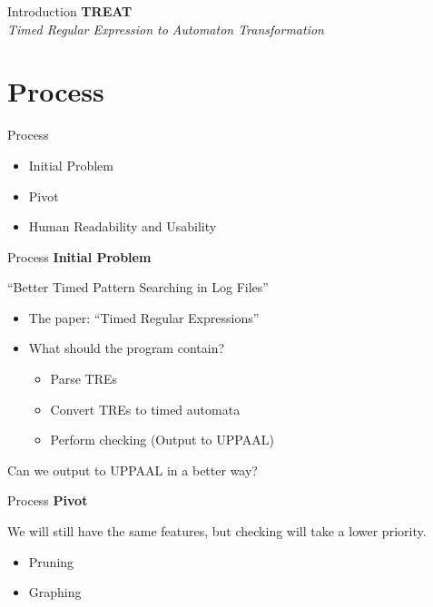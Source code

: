 
\begin{frame}{Introduction}
    \centering
    \LARGE\textbf{TREAT} \\
    \vspace{0.5cm}
    \Large\textit{Timed Regular Expression to Automaton Transformation}
\end{frame}

\section{Process}

\begin{frame}{Process}
    \begin{itemize}
        \item Initial Problem
        \item Pivot
        \item Human Readability and Usability
    \end{itemize}
\end{frame}

\begin{frame}{Process}
    \textbf{Initial Problem}

    ``Better Timed Pattern Searching in Log Files''
    \newline
    \begin{itemize}
        \item The paper: ``Timed Regular Expressions''
        \item What should the program contain?
              \begin{itemize}
                  \item Parse TREs
                  \item Convert TREs to timed automata
                  \item Perform checking (Output to UPPAAL)
              \end{itemize}
    \end{itemize}

    Can we output to UPPAAL in a better way?
\end{frame}

\begin{frame}{Process}
    \textbf{Pivot}

    We will still have the same features, but checking will take a lower priority.
    \newline
    \begin{itemize}
        \item Pruning
        \item Graphing
    \end{itemize}
\end{frame}

